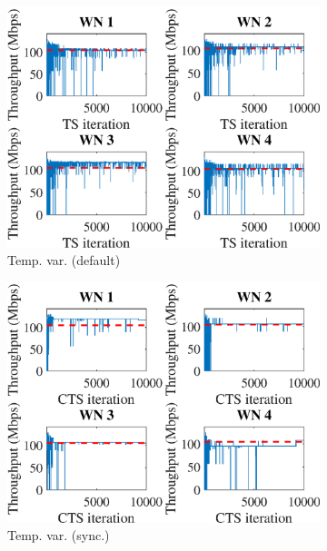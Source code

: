 \documentclass[preprint,12pt]{article}
\begin{document}
\begin{figure}[h!]
\begin{subfigure}[b]{.3\textwidth}
		\includegraphics[width=\textwidth]{images/temporal_individual_tpt_TS}
		\caption{Temp. var.  (default)}\label{fig:temporal_individual_tpt_TS}
	\end{subfigure}
	\begin{subfigure}[b]{.3\textwidth}
		\includegraphics[width=\textwidth]{images/temporal_individual_tpt_CTS}
		\caption{Temp. var.  (sync.)}\label{fig:temporal_individual_tpt_CTS}
	\end{subfigure}\\
	\begin{subfigure}[b]{.3\textwidth}

\end{subfigure}
\end{figure}
\end{document}
